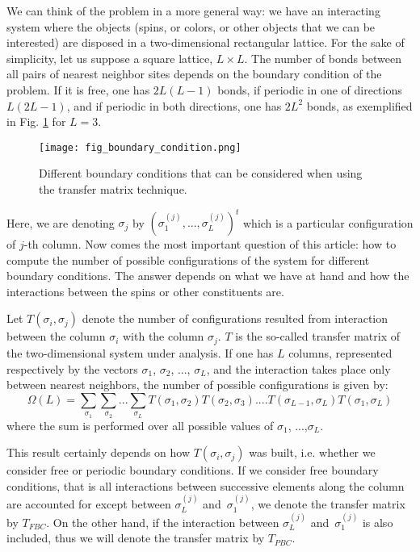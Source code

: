 \documentclass[3p, 10pt, onecolumn]{elsarticle}
\begin{document}
We can think of the problem in a more general way: we have an interacting
system where the objects (spins, or colors, or other objects that we can be
interested) are disposed in a two-dimensional rectangular lattice. For the
sake of simplicity, let us suppose a square lattice, $L\times L$. The number
of bonds between all pairs of nearest neighbor sites depends on the boundary
condition of the problem. If it is free, one has $2L(L-1)$ bonds, if
periodic in one of directions $L(2L-1)$, and if periodic in both directions,
one has $2L^{2}$ bonds, as exemplified in Fig. \ref{Fig:boundary_conditions}
for $L=3$.

\begin{figure}[tbp]
\begin{center}
\texttt{[image: fig\_boundary\_condition.png]}
\end{center}
\caption{Different boundary conditions that can be considered when using the
transfer matrix technique. }
\label{Fig:boundary_conditions}
\end{figure}

Here, we are denoting $\sigma _{j}$ by $(\sigma _{1}^{(j)},...,\sigma
_{L}^{(j)})^{t}$ which is a particular configuration of $j$-th column. Now
comes the most important question of this article: how to compute the number
of possible configurations of the system for different boundary conditions.
The answer depends on what we have at hand and how the interactions between
the spins or other constituents are.

Let $T(\sigma _{i},\sigma _{j})$ denote the number of configurations
resulted from interaction between the column $\sigma _{i}$ with the column $%
\sigma _{j}$. $T$ is the so-called transfer matrix of the two-dimensional
system under analysis. If one has $L$ columns, represented respectively by
the vectors $\sigma _{1}$, $\sigma _{2}$, ..., $\sigma _{L}$, and the
interaction takes place only between nearest neighbors, the number of
possible configurations is given by:%
\begin{equation}
\Omega(L)=\sum_{\sigma _{1}}\sum_{\sigma _{2}}...\sum_{\sigma _{L}}T(\sigma
_{1},\sigma _{2})T(\sigma _{2},\sigma _{3})....T(\sigma _{L-1},\sigma
_{L})T(\sigma _{1},\sigma _{L})  \label{Eq:Transfer_matrix_first}
\end{equation}%
where the sum is performed over all possible values of $\sigma _{1}$, ...,$%
\sigma _{L}$.

This result certainly depends on how $T(\sigma _{i},\sigma _{j})$ was built,
i.e. whether we consider free or periodic boundary conditions. If we
consider free boundary conditions, that is all interactions between
successive elements along the column are accounted for except between $%
\sigma_{L}^{(j)}$ and\ $\sigma _{1}^{(j)}$, we denote the transfer matrix by 
$T_{FBC}$. On the other hand, if the interaction between $\sigma _{L}^{(j)}$
and\ $\sigma _{1}^{(j)}$ is also included, thus we will denote the transfer
matrix by $T_{PBC}$.
\end{document}
